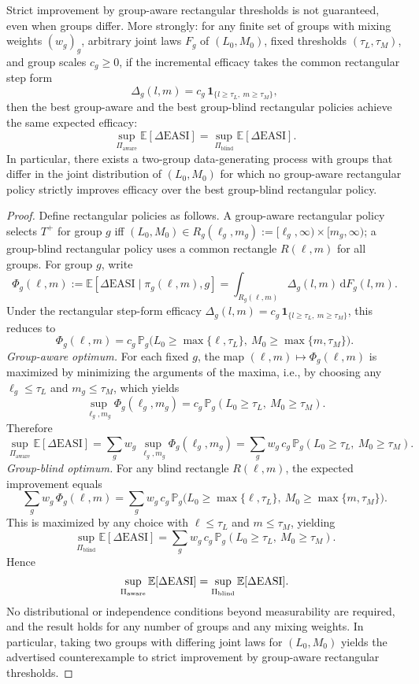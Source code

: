 ﻿\begin{theorem}\label{thm:rectangular-noadvantage}
Strict improvement by group-aware rectangular thresholds is not guaranteed, even when groups differ. More strongly: for any finite set of groups with mixing weights $(w_g)_g$, arbitrary joint laws $F_g$ of $(L_0,M_0)$, fixed thresholds $(\tau_L,\tau_M)$, and group scales $c_g\ge0$, if the incremental efficacy takes the common rectangular step form
\[
\Delta_g(l,m)=c_g\,\mathbf 1_{\{l\ge\tau_L,\ m\ge\tau_M\}},
\]
then the best group-aware and the best group-blind rectangular policies achieve the same expected efficacy:
\[
\sup_{\Pi_{\mathrm{aware}}}\mathbb E[\Delta\mathrm{EASI}]=\sup_{\Pi_{\mathrm{blind}}}\mathbb E[\Delta\mathrm{EASI}].
\]
In particular, there exists a two-group data-generating process with groups that differ in the joint distribution of $(L_0,M_0)$ for which no group-aware rectangular policy strictly improves efficacy over the best group-blind rectangular policy.
\end{theorem}

\begin{proof}
Define rectangular policies as follows. A group-aware rectangular policy selects $T^+$ for group $g$ iff $(L_0,M_0)\in R_g(\ell_g,m_g):=[\ell_g,\infty)\times[m_g,\infty)$; a group-blind rectangular policy uses a common rectangle $R(\ell,m)$ for all groups. For group $g$, write
\[
\Phi_g(\ell,m):=\mathbb E[\Delta\mathrm{EASI}\mid \pi_g(\ell,m),g]
= \int_{R_g(\ell,m)} \Delta_g(l,m)\,\mathrm dF_g(l,m).
\]
Under the rectangular step-form efficacy $\Delta_g(l,m)=c_g\,\mathbf 1_{\{l\ge\tau_L,\ m\ge\tau_M\}}$, this reduces to
\[
\Phi_g(\ell,m)=c_g\,\mathbb P_g\big(L_0\ge\max\{\ell,\tau_L\},\ M_0\ge\max\{m,\tau_M\}\big).
\]
\emph{Group-aware optimum.} For each fixed $g$, the map $(\ell,m)\mapsto \Phi_g(\ell,m)$ is maximized by minimizing the arguments of the maxima, i.e., by choosing any $\ell_g\le\tau_L$ and $m_g\le\tau_M$, which yields
\[
\sup_{\ell_g,m_g}\Phi_g(\ell_g,m_g)=c_g\,\mathbb P_g(L_0\ge\tau_L,\ M_0\ge\tau_M).
\]
Therefore
\[
\sup_{\Pi_{\mathrm{aware}}}\mathbb E[\Delta\mathrm{EASI}]=\sum_g w_g\,\sup_{\ell_g,m_g}\Phi_g(\ell_g,m_g)
=\sum_g w_g\,c_g\,\mathbb P_g(L_0\ge\tau_L,\ M_0\ge\tau_M).
\]
\emph{Group-blind optimum.} For any blind rectangle $R(\ell,m)$, the expected improvement equals
\[
\sum_g w_g\,\Phi_g(\ell,m)=\sum_g w_g\,c_g\,\mathbb P_g\big(L_0\ge\max\{\ell,\tau_L\},\ M_0\ge\max\{m,\tau_M\}\big).
\]
This is maximized by any choice with $\ell\le\tau_L$ and $m\le\tau_M$, yielding
\[
\sup_{\Pi_{\mathrm{blind}}}\mathbb E[\Delta\mathrm{EASI}]=\sum_g w_g\,c_g\,\mathbb P_g(L_0\ge\tau_L,\ M_0\ge\tau_M).
\]
Hence
\[
\sup_{\Pi_{\mathrm{aware}}}\mathbb E[\Delta\mathrm{EASI}]=\sup_{\Pi_{\mathrm{blind}}}\mathbb E[\Delta\mathrm{EASI}].\qedhere
\]
No distributional or independence conditions beyond measurability are required, and the result holds for any number of groups and any mixing weights. In particular, taking two groups with differing joint laws for $(L_0,M_0)$ yields the advertised counterexample to strict improvement by group-aware rectangular thresholds.
\end{proof}
